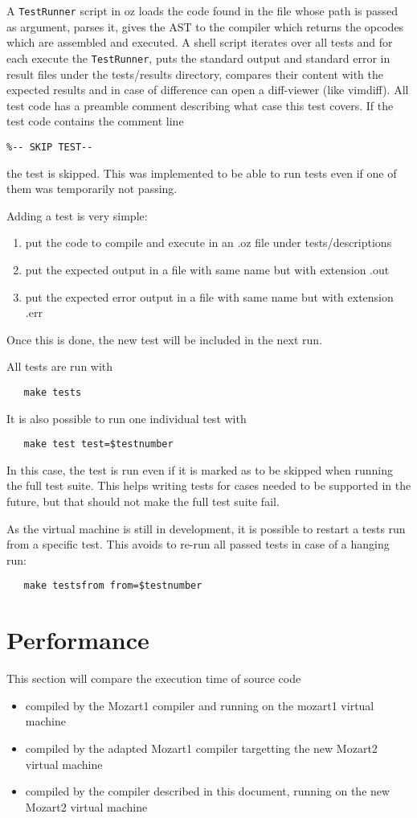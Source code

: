 \documentclass[a4paper]{memoir}
\begin{document}
A \lstinline!TestRunner! script in oz loads the code found in the file whose path is passed as argument, parses it, gives the AST to the compiler which returns the opcodes which are assembled and executed. 
A shell script iterates over all tests and for each execute the
\lstinline!TestRunner!, puts the standard output and standard error in result
files under the tests/results directory, compares their content with the
expected results and in case of difference can open a diff-viewer (like vimdiff).
All test code has a preamble comment describing what case this test covers.
If the test code contains the comment line
\begin{lstlisting}
%-- SKIP TEST-- 
\end{lstlisting}
the test is skipped. This was implemented to be able to run tests even if one of them was temporarily not passing.

Adding a test is very simple:
\begin{enumerate}
  \item put the code to compile and execute in an .oz file under tests/descriptions
  \item put the expected output in a file with same name but with extension .out
  \item put the expected error output in a file with same name but with extension .err
\end{enumerate}
Once this is done, the new test will be included in the next run.

All tests are run with 
\begin{lstlisting}
   make tests
\end{lstlisting}
It is also possible to run one individual test with
\begin{lstlisting}
   make test test=$testnumber
\end{lstlisting}
In this case, the test is run
even if it is marked as to be skipped when running the full test suite. This helps writing tests for cases needed to be supported in the future, but that should not make the full test suite fail.

As the virtual machine is still in development, it is possible to restart a
tests run from a specific test. This avoids to re-run all passed tests in case
of a hanging run:
\begin{lstlisting}
   make testsfrom from=$testnumber
\end{lstlisting}

\section{Performance}
This section will compare the execution time of source code
\begin{itemize}
  \item compiled by the Mozart1 compiler and running on the mozart1 virtual
    machine 
  \item compiled by the adapted Mozart1 compiler targetting the new Mozart2 virtual
    machine
  \item compiled by the compiler described in this document, running on the new
    Mozart2 virtual machine
\end{itemize}
\end{document}
